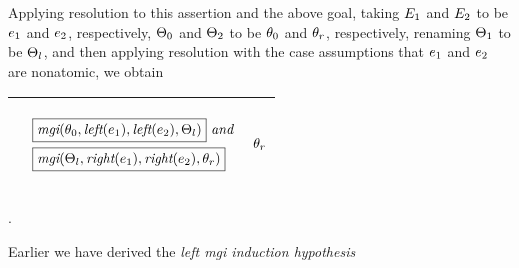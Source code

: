\documentclass[runningheads]{llncs}
\DeclareMathOperator{\uand}{\emph{and}\,}
\DeclareMathOperator{\lef}{\emph{left}}
\DeclareMathOperator{\rig}{\emph{right}}
\DeclareMathOperator{\mgi}{\emph{mgi}}
\begin{document}
 Applying resolution to this assertion and the above goal, taking $E_{1}$ and $E_{2}$  to be  $e_{1}$ and $e_{2}$, respectively, $\Theta_{0}$ and 
$\Theta_{2}$ to be  $\theta_{0}$ and  $\theta_{r}$, respectively, renaming $\Theta_{1}$ to be $\Theta_{l}$, and then applying resolution with the case assumptions that $e_{1}$ and $e_{2}$ are nonatomic, we obtain                                                               \begin{center}
\begin{tabular}{|m{}|m{}||m{}|}
 \hline 
  & 
   \begin{center}
{$\begin{aligned}
  &\boxed{\mgi (\thet{0}, \lef(\e{1}), \lef(\e{2}), \Thet{l})}
  \, \uand \\
   &\boxed{\mgi (\Thet{l}, \rig(\e{1}), \rig(\e{2}), \thet{r})}
   \end{aligned}
$}
\end{center}
& 
\begin{center}

$ \begin{aligned}
   \theta_{r}
 \end{aligned}    
$
\end{center}
\\
\hline
\end{tabular}.
\end{center}  
Earlier we have derived the \emph{left mgi induction hypothesis}
\end{document}
